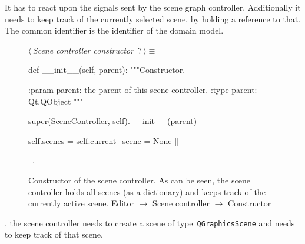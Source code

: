 \documentclass[%
    a4paper,    %
    justified,  %
    nobib,      %
    openany     %
]{tufte-book}
\makeatletter
\renewcommand{\label}[1]{\@tufte@label{##1}}%
\makeatother
\begin{document}
 It has to
react upon the signals sent by the scene graph controller. Additionally it needs
to keep track of the currently selected scene, by holding a reference to that.
The common identifier is the identifier of the domain model.

\begin{figure}
\begin{flushleft} \small
\begin{minipage}{\linewidth}\label{scrap92}\raggedright\small
{} $\langle\,${\itshape Scene controller constructor}\nobreak\ {\footnotesize {?}}$\,\rangle\equiv$
\vspace{-1ex}
\begin{pythoncode}
def __init__(self, parent):
    """Constructor.

    :param parent: the parent of this scene controller.
    :type parent: Qt.QObject
    """

    super(SceneController, self).__init__(parent)

    self.scenes = {}
    self.current_scene = None
|\NWsep|
\end{pythoncode}
\vspace{1.5ex}
\footnotesize
\begin{list}{}{\setlength{\itemsep}{-\parsep}\setlength{\itemindent}{-\leftmargin}}
\item \NWtxtMacroRefIn\ .

\item{}
\end{list}
\end{minipage}\vspace{4ex}
\end{flushleft}
\caption{Constructor of the scene controller. As can be seen, the scene
  controller holds all scenes (as a dictionary) and keeps track of the currently
  active scene.
  \newline{}\newline{}Editor $\rightarrow$ Scene controller $\rightarrow$
  Constructor}
\label{editor:lst:scene-controller:constructor}
\end{figure}

, the scene controller needs to
create a scene of type~\verb=QGraphicsScene= and needs to keep track of that
scene.
\end{document}
